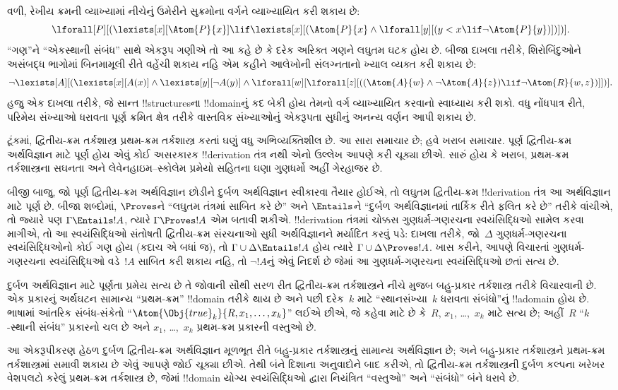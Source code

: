 \documentclass[../../../include/open-logic-section]{subfiles}
\begin{document}
વળી, રેખીય ક્રમની વ્યાખ્યામાં નીચેનું ઉમેરીને સુક્રમોના વર્ગને
વ્યાખ્યાયિત કરી શકાય છે:
\[
\lforall[P][(\lexists[x][\Atom{P}{x}] \lif \lexists[x][(\Atom{P}{x}
    \land \lforall[y][(y < x \lif \lnot \Atom{P}{y})])])].
\]
``ગણ''ને ``એકસ્થાની સંબંધ'' સાથે એકરૂપ ગણીએ તો આ કહે છે કે દરેક
અરિક્ત ગણને લઘુતમ ઘટક હોય છે. બીજા દાખલા તરીકે, શિરોબિંદુઓને
અસંબદ્ધ ભાગોમાં બિનમામૂલી રીતે વહેંચી શકાય નહિ એમ કહીને આલેખોની
સંલગ્નતાનો ખ્યાલ વ્યક્ત કરી શકાય છે:
\[
\lnot \lexists[A][(\lexists[x][A(x)] \land \lexists[y][\lnot A(y)]
  \land \lforall[w][\lforall[z][((\Atom{A}{w} \land \lnot \Atom{A}{z})
      \lif \lnot \Atom{R}{w,z})]])].
\]
હજુ એક દાખલા તરીકે, જે સાન્ત !!{structure}sના !!{domain}નું કદ બેકી
હોય તેમનો વર્ગ વ્યાખ્યાયિત કરવાનો સ્વાધ્યાય કરી શકો. વધુ નોંધપાત્ર રીતે,
પરિમેય સંખ્યાઓ ધરાવતા પૂર્ણ ક્રમિત ક્ષેત્ર તરીકે વાસ્તવિક સંખ્યાઓનું
એકરૂપતા સુધીનું અનન્ય વર્ણન આપી શકાય છે.

ટૂંકમાં, દ્વિતીય-ક્રમ તર્કશાસ્ત્ર પ્રથમ-ક્રમ તર્કશાસ્ત્ર કરતાં ઘણું વધુ
અભિવ્યક્તિશીલ છે. આ સારા સમાચાર છે; હવે ખરાબ સમાચાર. પૂર્ણ દ્વિતીય-ક્રમ
અર્થવિજ્ઞાન માટે પૂર્ણ હોય એવું કોઈ અસરકારક !!{derivation} તંત્ર નથી
એનો ઉલ્લેખ આપણે કરી ચૂક્યા છીએ. સારું હોય કે ખરાબ, પ્રથમ-ક્રમ
તર્કશાસ્ત્રના સઘનતા અને લેવેનહાઇમ--સ્કોલેમ પ્રમેયો સહિતના ઘણા ગુણધર્મો
અહીં ગેરહાજર છે.

બીજી બાજુ, જો પૂર્ણ દ્વિતીય-ક્રમ અર્થવિજ્ઞાન છોડીને દુર્બળ અર્થવિજ્ઞાન
સ્વીકારવા તૈયાર હોઈએ, તો લઘુતમ દ્વિતીય-ક્રમ !!{derivation} તંત્ર આ
અર્થવિજ્ઞાન માટે પૂર્ણ છે. બીજા શબ્દોમાં, $\Proves$ને ``લઘુતમ તંત્રમાં
સાબિત કરે છે'' અને $\Entails$ને ``દુર્બળ અર્થવિજ્ઞાનમાં તાર્કિક રીતે
ફલિત કરે છે'' તરીકે વાંચીએ, તો જ્યારે પણ $\Gamma \Entails !A$, ત્યારે
$\Gamma \Proves !A$ એમ બતાવી શકીએ. !!{derivation} તંત્રમાં ચોક્કસ
ગુણધર્મ-ગણરચના સ્વયંસિદ્ધિઓ સામેલ કરવા માગીએ, તો આ સ્વયંસિદ્ધિઓ
સંતોષતી દ્વિતીય-ક્રમ સંરચનાઓ સુધી અર્થવિજ્ઞાનને મર્યાદિત કરવું પડે:
દાખલા તરીકે, જો~$\Delta$ ગુણધર્મ-ગણરચના સ્વયંસિદ્ધિઓનો કોઈ ગણ હોય
(કદાચ એ બધાં જ), તો $\Gamma \cup \Delta \Entails !A$ હોય ત્યારે
$\Gamma \cup \Delta \Proves !A$. ખાસ કરીને, આપણે વિચારતાં
ગુણધર્મ-ગણરચના સ્વયંસિદ્ધિઓ વડે~$!A$ સાબિત કરી શકાય નહિ, તો
$\lnot !A$નું એવું નિદર્શ છે જેમાં આ ગુણધર્મ-ગણરચના સ્વયંસિદ્ધિઓ છતાં
સત્ય છે.

દુર્બળ અર્થવિજ્ઞાન માટે પૂર્ણતા પ્રમેય સત્ય છે તે જોવાની સૌથી સરળ રીત
દ્વિતીય-ક્રમ તર્કશાસ્ત્રને નીચે મુજબ બહુ-પ્રકાર તર્કશાસ્ત્ર તરીકે
વિચારવાની છે. એક પ્રકારનું અર્થઘટન સામાન્ય ``પ્રથમ-ક્રમ'' !!{domain}
તરીકે થાય છે અને પછી દરેક~$k$ માટે ``સ્થાનસંખ્યા~$k$ ધરાવતા સંબંધો''નું
!!a{domain} હોય છે. ભાષામાં આંતરિક સંબંધ-સંકેતો
``$\Atom{\Obj{true}_k}{R,x_1,\dots,x_k}$'' લઈએ છીએ, જે કહેવા માટે છે
કે~$R$, $x_1$, \dots,~$x_k$ માટે સત્ય છે; અહીં~$R$ ``$k$-સ્થાની
સંબંધ'' પ્રકારનો ચલ છે અને $x_1$, \dots,~$x_k$ પ્રથમ-ક્રમ પ્રકારની
વસ્તુઓ છે.

આ એકરૂપીકરણ હેઠળ દુર્બળ દ્વિતીય-ક્રમ અર્થવિજ્ઞાન મૂળભૂત રીતે બહુ-પ્રકાર
તર્કશાસ્ત્રનું સામાન્ય અર્થવિજ્ઞાન છે; અને બહુ-પ્રકાર તર્કશાસ્ત્રને
પ્રથમ-ક્રમ તર્કશાસ્ત્રમાં સમાવી શકાય છે એવું આપણે જોઈ ચૂક્યા છીએ. તેથી
બંને દિશાના અનુવાદોને બાદ કરીએ, તો દ્વિતીય-ક્રમ તર્કશાસ્ત્રની દુર્બળ
કલ્પના ખરેખર વેશપલટો કરેલું પ્રથમ-ક્રમ તર્કશાસ્ત્ર છે, જેમાં !!{domain}
યોગ્ય સ્વયંસિદ્ધિઓ દ્વારા નિયંત્રિત ``વસ્તુઓ'' અને ``સંબંધો'' બંને ધરાવે
છે.
\end{document}
